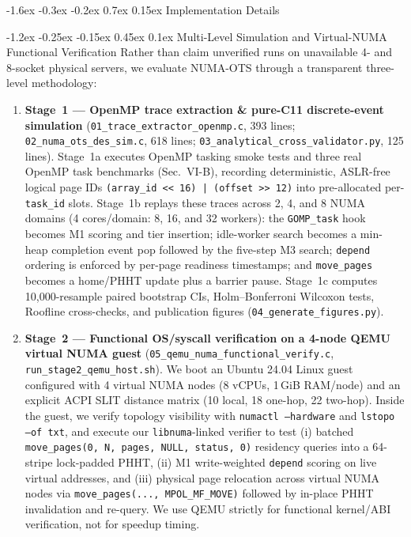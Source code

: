 \documentclass[10pt,twocolumn,letterpaper]{article}
\makeatletter
\renewcommand{\section}{\@startsection{section}{1}{\z@}%
  {-1.6ex \@plus -0.3ex \@minus -0.2ex}%
  {0.7ex \@plus 0.15ex}%
  {\normalfont\normalsize\centering\scshape}}
\renewcommand{\subsection}{\@startsection{subsection}{2}{\z@}%
  {-1.2ex \@plus -0.25ex \@minus -0.15ex}%
  {0.45ex \@plus 0.1ex}%
  {\normalfont\small\itshape}}
\makeatother
\begin{document}
\section{Implementation Details}

\subsection{Multi-Level Simulation and Virtual-NUMA Functional Verification}
Rather than claim unverified runs on unavailable 4- and 8-socket physical servers, we evaluate NUMA-OTS through a transparent three-level methodology:
\begin{enumerate}\setlength{\itemsep}{1pt}\setlength{\parskip}{0pt}\setlength{\topsep}{2pt}
\item \textbf{Stage~1 --- OpenMP trace extraction \& pure-C11 discrete-event simulation} (\texttt{01\_trace\_extractor\_openmp.c}, 393 lines; \texttt{02\_numa\_ots\_des\_sim.c}, 618 lines; \texttt{03\_analytical\_cross\_validator.py}, 125 lines). Stage~1a executes OpenMP tasking smoke tests and three real OpenMP task benchmarks (Sec.~VI-B), recording deterministic, ASLR-free logical page IDs \texttt{(array\_id << 16) | (offset >> 12)} into pre-allocated per-\texttt{task\_id} slots. Stage~1b replays these traces across 2, 4, and 8 NUMA domains (4 cores/domain: 8, 16, and 32 workers): the \texttt{GOMP\_task} hook becomes M1 scoring and tier insertion; idle-worker search becomes a min-heap completion event pop followed by the five-step M3 search; \texttt{depend} ordering is enforced by per-page readiness timestamps; and \texttt{move\_pages} becomes a home/PHHT update plus a barrier pause. Stage~1c computes 10,000-resample paired bootstrap CIs, Holm--Bonferroni Wilcoxon tests, Roofline cross-checks, and publication figures (\texttt{04\_generate\_figures.py}).
\item \textbf{Stage~2 --- Functional OS/syscall verification on a 4-node QEMU virtual NUMA guest} (\texttt{05\_qemu\_numa\_functional\_verify.c}, \texttt{run\_stage2\_qemu\_host.sh}). We boot an Ubuntu 24.04 Linux guest configured with 4 virtual NUMA nodes (8 vCPUs, 1\,GiB RAM/node) and an explicit ACPI SLIT distance matrix (10 local, 18 one-hop, 22 two-hop). Inside the guest, we verify topology visibility with \texttt{numactl --hardware} and \texttt{lstopo --of txt}, and execute our \texttt{libnuma}-linked verifier to test (i) batched \texttt{move\_pages(0, N, pages, NULL, status, 0)} residency queries into a 64-stripe lock-padded PHHT, (ii) M1 write-weighted \texttt{depend} scoring on live virtual addresses, and (iii) physical page relocation across virtual NUMA nodes via \texttt{move\_pages(..., MPOL\_MF\_MOVE)} followed by in-place PHHT invalidation and re-query. We use QEMU strictly for functional kernel/ABI verification, not for speedup timing.

\end{enumerate}
\end{document}
